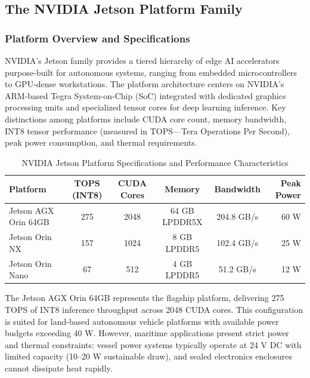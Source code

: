 \subsection{The NVIDIA Jetson Platform Family}

\subsubsection{Platform Overview and Specifications}

NVIDIA's Jetson family provides a tiered hierarchy of edge AI accelerators purpose-built for autonomous systems, ranging from embedded microcontrollers to GPU-dense workstations. The platform architecture centers on NVIDIA's ARM-based Tegra System-on-Chip (SoC) integrated with dedicated graphics processing units and specialized tensor cores for deep learning inference. \cite{NVIDIAJetsonAGXOrin} Key distinctions among platforms include CUDA core count, memory bandwidth, INT8 tensor performance (measured in TOPS---Tera Operations Per Second), peak power consumption, and thermal requirements.

\begin{table}[h]
\centering
\caption{NVIDIA Jetson Platform Specifications and Performance Characteristics}
\label{tab:jetson_specs}
\small
\begin{tabular}{lccccr}
\toprule
\textbf{Platform} & \textbf{TOPS (INT8)} & \textbf{CUDA Cores} & \textbf{Memory} & \textbf{Bandwidth} & \textbf{Peak Power} \\
\midrule
Jetson AGX Orin 64GB & 275 & 2048 & 64 GB LPDDR5X & 204.8 GB/s & 60 W \\
Jetson Orin NX & 157 & 1024 & 8 GB LPDDR5 & 102.4 GB/s & 25 W \\
Jetson Orin Nano & 67 & 512 & 4 GB LPDDR5 & 51.2 GB/s & 12 W \\
\bottomrule
\end{tabular}
\end{table}

The Jetson AGX Orin 64GB represents the flagship platform, delivering 275 TOPS of INT8 inference throughput across 2048 CUDA cores. This configuration is suited for land-based autonomous vehicle platforms with available power budgets exceeding 40 W. However, maritime applications present strict power and thermal constraints: vessel power systems typically operate at 24 V DC with limited capacity (10--20 W sustainable draw), and sealed electronics enclosures cannot dissipate heat rapidly. \cite{LiuEdgeComputingAutonomousDriving}

